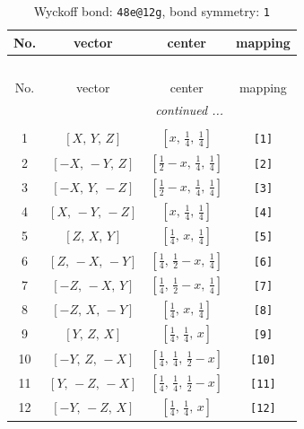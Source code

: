\documentclass[fleqn,8pt]{jsarticle}
\begin{document}
\begin{longtable}{cccc}
\caption{Wyckoff bond: {\tt 48e@12g}, bond symmetry: {\tt 1}}
 \\
 \hline \hline
No. & vector & center & mapping \\ \hline \endfirsthead

\multicolumn{3}{l}{\tablename\ \thetable{}} \\
 \hline \hline
No. & vector & center & mapping \\ \hline \endhead

 \hline \hline
\multicolumn{3}{r}{\footnotesize\it continued ...} \\ \endfoot

 \hline \hline
\multicolumn{3}{r}{} \\ \endlastfoot

1 & $\left[ X,\, Y,\, Z \right]$ & $\left[ x,\, \frac{1}{4},\, \frac{1}{4} \right]$ & {\tt [1]} \\ \hline
2 & $\left[ - X,\, - Y,\, Z \right]$ & $\left[ \frac{1}{2} - x,\, \frac{1}{4},\, \frac{1}{4} \right]$ & {\tt [2]} \\ \hline
3 & $\left[ - X,\, Y,\, - Z \right]$ & $\left[ \frac{1}{2} - x,\, \frac{1}{4},\, \frac{1}{4} \right]$ & {\tt [3]} \\ \hline
4 & $\left[ X,\, - Y,\, - Z \right]$ & $\left[ x,\, \frac{1}{4},\, \frac{1}{4} \right]$ & {\tt [4]} \\ \hline
5 & $\left[ Z,\, X,\, Y \right]$ & $\left[ \frac{1}{4},\, x,\, \frac{1}{4} \right]$ & {\tt [5]} \\ \hline
6 & $\left[ Z,\, - X,\, - Y \right]$ & $\left[ \frac{1}{4},\, \frac{1}{2} - x,\, \frac{1}{4} \right]$ & {\tt [6]} \\ \hline
7 & $\left[ - Z,\, - X,\, Y \right]$ & $\left[ \frac{1}{4},\, \frac{1}{2} - x,\, \frac{1}{4} \right]$ & {\tt [7]} \\ \hline
8 & $\left[ - Z,\, X,\, - Y \right]$ & $\left[ \frac{1}{4},\, x,\, \frac{1}{4} \right]$ & {\tt [8]} \\ \hline
9 & $\left[ Y,\, Z,\, X \right]$ & $\left[ \frac{1}{4},\, \frac{1}{4},\, x \right]$ & {\tt [9]} \\ \hline
10 & $\left[ - Y,\, Z,\, - X \right]$ & $\left[ \frac{1}{4},\, \frac{1}{4},\, \frac{1}{2} - x \right]$ & {\tt [10]} \\ \hline
11 & $\left[ Y,\, - Z,\, - X \right]$ & $\left[ \frac{1}{4},\, \frac{1}{4},\, \frac{1}{2} - x \right]$ & {\tt [11]} \\ \hline
12 & $\left[ - Y,\, - Z,\, X \right]$ & $\left[ \frac{1}{4},\, \frac{1}{4},\, x \right]$ & {\tt [12]} \\ \hline

\end{longtable}
\end{document}
